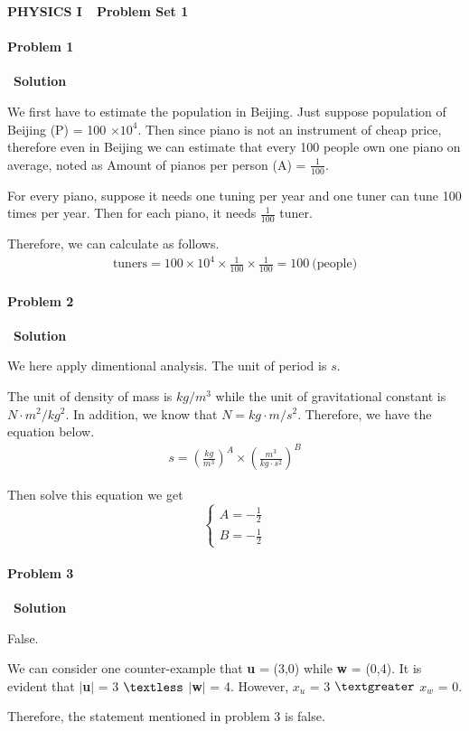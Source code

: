 \documentclass[12pt,a4paper]{article}
\begin{document}
\centerline{\Huge{{\textbf{PHYSICS I\ \ Problem Set 1}}}}
\vspace{0.5cm}
\paragraph{\large \textbf{Problem 1}}~{\textbf{Solution}}
\vspace{2mm}
\par{\normalsize We first have to estimate the population in Beijing. Just suppose population of Beijing (P) = 100 $\times 10^4$. Then since piano is not an instrument of cheap price, therefore even in Beijing we can estimate that every 100 people own one piano on average, noted as Amount of pianos per person (A) = $\frac{1}{100}$.}
\par For every piano, suppose it needs one tuning per year and one tuner can tune 100 times per year. Then for each piano, it needs $\frac{1}{100}$ tuner.
\par Therefore, we can calculate as follows.
\begin{align*}
	\text{tuners} = 100 \times 10^4 \times \frac{1}{100} \times \frac{1}{100} = 100 \ \text{(people)}
\end{align*}

\paragraph{\large \textbf{Problem 2}}~{\textbf{Solution}}
\vspace{2mm}
\par We here apply dimentional analysis. The unit of period is $s$.
\par The unit of density of mass is $kg/m^3$ while the unit of gravitational constant is $N\cdot m^2/kg^2$. In addition, we know that $N=kg\cdot m/s^2$. Therefore, we have the equation below.
\begin{align*}
	s = (\frac{kg}{m^3})^A \times (\frac{m^3}{kg\cdot s^2})^B
\end{align*}
\par Then solve this equation we get
\begin{equation*}
	\begin{cases}
		A=-\frac{1}{2}\\
		B=-\frac{1}{2}
	\end{cases}
\end{equation*}

\paragraph{\large \textbf{Problem 3}}~{\textbf{Solution}}
\vspace{2mm}
\par False.
\par We can consider one counter-example that \textbf{u} = (3,0) while \textbf{w} = (0,4). It is evident that $\lvert$\textbf{u}$\rvert$ = 3 $\textless$ $\lvert$\textbf{w}$\rvert$ = 4. However, $x_u$ = 3 $\textgreater$ $x_w$ = 0.
\par Therefore, the statement mentioned in problem 3 is false.
\end{document}
